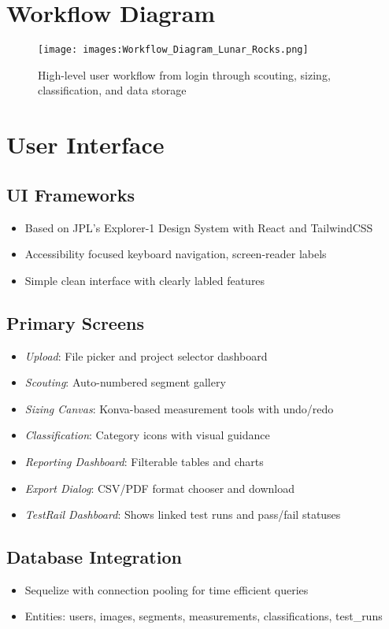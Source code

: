 \documentclass{article}
\begin{document}
\section{Workflow Diagram}
\begin{figure}[h]
  \centering
  \texttt{[image: images:Workflow\_Diagram\_Lunar\_Rocks.png]}
  \caption{High-level user workflow from login through scouting, sizing, classification, and data storage}
  \label{fig:workflow}
\end{figure}

\section{User Interface}
\subsection{UI Frameworks}
\begin{itemize}
  \item Based on JPL’s Explorer-1 Design System with React and TailwindCSS
  \item Accessibility focused keyboard navigation, screen-reader labels
  \item Simple clean interface with clearly labled features
\end{itemize}

\subsection{Primary Screens}
\begin{itemize}
  \item \emph{Upload}: File picker and project selector dashboard
  \item \emph{Scouting}: Auto-numbered segment gallery
  \item \emph{Sizing Canvas}: Konva-based measurement tools with undo/redo
  \item \emph{Classification}: Category icons with visual guidance
  \item \emph{Reporting Dashboard}: Filterable tables and charts
  \item \emph{Export Dialog}: CSV/PDF format chooser and download
  \item \emph{TestRail Dashboard}: Shows linked test runs and pass/fail statuses
\end{itemize}

\subsection{Database Integration}
\begin{itemize}
  \item Sequelize with connection pooling for time efficient queries
  \item Entities: users, images, segments, measurements, classifications, test_runs
\end{itemize}
\end{document}
